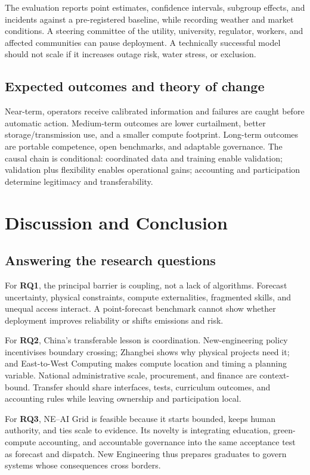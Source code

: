 \documentclass[12pt]{article}
\begin{document}
The evaluation reports point estimates, confidence intervals, subgroup effects, and incidents against a pre-registered baseline, while recording weather and market conditions. A steering committee of the utility, university, regulator, workers, and affected communities can pause deployment. A technically successful model should not scale if it increases outage risk, water stress, or exclusion.

\subsection{Expected outcomes and theory of change}
Near-term, operators receive calibrated information and failures are caught before automatic action. Medium-term outcomes are lower curtailment, better storage/transmission use, and a smaller compute footprint. Long-term outcomes are portable competence, open benchmarks, and adaptable governance. The causal chain is conditional: coordinated data and training enable validation; validation plus flexibility enables operational gains; accounting and participation determine legitimacy and transferability.

\section{Discussion and Conclusion}

\subsection{Answering the research questions}
For \textbf{RQ1}, the principal barrier is coupling, not a lack of algorithms. Forecast uncertainty, physical constraints, compute externalities, fragmented skills, and unequal access interact. A point-forecast benchmark cannot show whether deployment improves reliability or shifts emissions and risk.

For \textbf{RQ2}, China's transferable lesson is coordination. New-engineering policy incentivises boundary crossing; Zhangbei shows why physical projects need it; and East-to-West Computing makes compute location and timing a planning variable. National administrative scale, procurement, and finance are context-bound. Transfer should share interfaces, tests, curriculum outcomes, and accounting rules while leaving ownership and participation local.

For \textbf{RQ3}, NE--AI Grid is feasible because it starts bounded, keeps human authority, and ties scale to evidence. Its novelty is integrating education, green-compute accounting, and accountable governance into the same acceptance test as forecast and dispatch. New Engineering thus prepares graduates to govern systems whose consequences cross borders.
\end{document}
